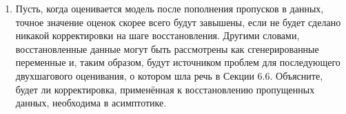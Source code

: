 \begin{enumerate}
\item Пусть, когда оценивается модель после пополнения пропусков в данных, точное значение оценок скорее всего будут завышены, если не будет сделано никакой корректировки на шаге восстановления. Другими словами, восстановленные данные могут быть рассмотрены как сгенерированные переменные и, таким образом, будут источником проблем для последующего двухшагового оценивания, о котором шла речь в Секции 6.6. Объясните, будет ли корректировка, применённая к восстановлению пропущенных данных, необходима в асимптотике.

\end{enumerate}



